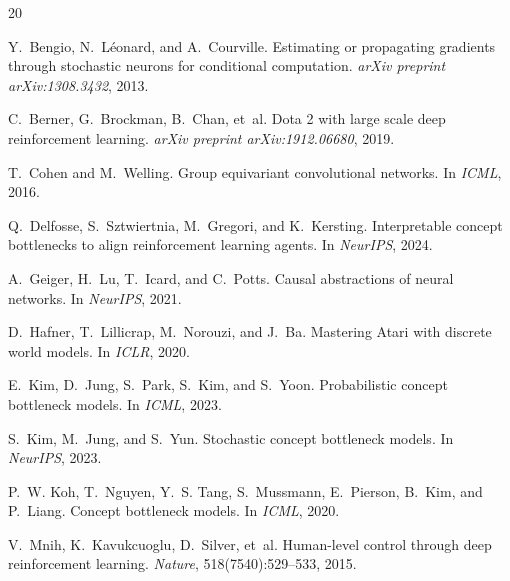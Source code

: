 \documentclass[11pt,a4paper]{article}
\begin{document}

\begin{thebibliography}{20}

Y.~Bengio, N.~L\'{e}onard, and A.~Courville.
\newblock Estimating or propagating gradients through stochastic neurons for conditional computation.
\newblock \emph{arXiv preprint arXiv:1308.3432}, 2013.

C.~Berner, G.~Brockman, B.~Chan, et~al.
\newblock Dota 2 with large scale deep reinforcement learning.
\newblock \emph{arXiv preprint arXiv:1912.06680}, 2019.

T.~Cohen and M.~Welling.
\newblock Group equivariant convolutional networks.
\newblock In \emph{ICML}, 2016.

Q.~Delfosse, S.~Sztwiertnia, M.~Gregori, and K.~Kersting.
\newblock Interpretable concept bottlenecks to align reinforcement learning agents.
\newblock In \emph{NeurIPS}, 2024.

A.~Geiger, H.~Lu, T.~Icard, and C.~Potts.
\newblock Causal abstractions of neural networks.
\newblock In \emph{NeurIPS}, 2021.

D.~Hafner, T.~Lillicrap, M.~Norouzi, and J.~Ba.
\newblock Mastering Atari with discrete world models.
\newblock In \emph{ICLR}, 2020.

E.~Kim, D.~Jung, S.~Park, S.~Kim, and S.~Yoon.
\newblock Probabilistic concept bottleneck models.
\newblock In \emph{ICML}, 2023.

S.~Kim, M.~Jung, and S.~Yun.
\newblock Stochastic concept bottleneck models.
\newblock In \emph{NeurIPS}, 2023.

P.~W. Koh, T.~Nguyen, Y.~S. Tang, S.~Mussmann, E.~Pierson, B.~Kim, and P.~Liang.
\newblock Concept bottleneck models.
\newblock In \emph{ICML}, 2020.

V.~Mnih, K.~Kavukcuoglu, D.~Silver, et~al.
\newblock Human-level control through deep reinforcement learning.
\newblock \emph{Nature}, 518(7540):529--533, 2015.


\end{thebibliography}
\end{document}
